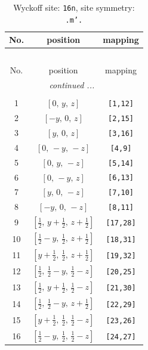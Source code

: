 \documentclass[fleqn,8pt]{jsarticle}
\begin{document}
\renewcommand{\arraystretch}{1.2}
\begin{longtable}{ccc}
\caption{Wyckoff site: {\tt 16n}, site symmetry: {\tt .m'.}}
 \\
 \hline \hline
No. & position & mapping \\ \hline \endfirsthead

\multicolumn{2}{l}{\tablename\ \thetable{}} \\
 \hline \hline
No. & position & mapping \\ \hline \endhead

 \hline \hline
\multicolumn{2}{r}{\footnotesize\it continued ...} \\ \endfoot

 \hline \hline
\multicolumn{2}{r}{} \\ \endlastfoot

1 & $\left[ 0,\, y,\, z \right]$ & {\tt [1,12]} \\ \hline
2 & $\left[ - y,\, 0,\, z \right]$ & {\tt [2,15]} \\ \hline
3 & $\left[ y,\, 0,\, z \right]$ & {\tt [3,16]} \\ \hline
4 & $\left[ 0,\, - y,\, - z \right]$ & {\tt [4,9]} \\ \hline
5 & $\left[ 0,\, y,\, - z \right]$ & {\tt [5,14]} \\ \hline
6 & $\left[ 0,\, - y,\, z \right]$ & {\tt [6,13]} \\ \hline
7 & $\left[ y,\, 0,\, - z \right]$ & {\tt [7,10]} \\ \hline
8 & $\left[ - y,\, 0,\, - z \right]$ & {\tt [8,11]} \\ \hline
9 & $\left[ \frac{1}{2},\, y + \frac{1}{2},\, z + \frac{1}{2} \right]$ & {\tt [17,28]} \\ \hline
10 & $\left[ \frac{1}{2} - y,\, \frac{1}{2},\, z + \frac{1}{2} \right]$ & {\tt [18,31]} \\ \hline
11 & $\left[ y + \frac{1}{2},\, \frac{1}{2},\, z + \frac{1}{2} \right]$ & {\tt [19,32]} \\ \hline
12 & $\left[ \frac{1}{2},\, \frac{1}{2} - y,\, \frac{1}{2} - z \right]$ & {\tt [20,25]} \\ \hline
13 & $\left[ \frac{1}{2},\, y + \frac{1}{2},\, \frac{1}{2} - z \right]$ & {\tt [21,30]} \\ \hline
14 & $\left[ \frac{1}{2},\, \frac{1}{2} - y,\, z + \frac{1}{2} \right]$ & {\tt [22,29]} \\ \hline
15 & $\left[ y + \frac{1}{2},\, \frac{1}{2},\, \frac{1}{2} - z \right]$ & {\tt [23,26]} \\ \hline
16 & $\left[ \frac{1}{2} - y,\, \frac{1}{2},\, \frac{1}{2} - z \right]$ & {\tt [24,27]} \\
\end{longtable}
\end{document}
